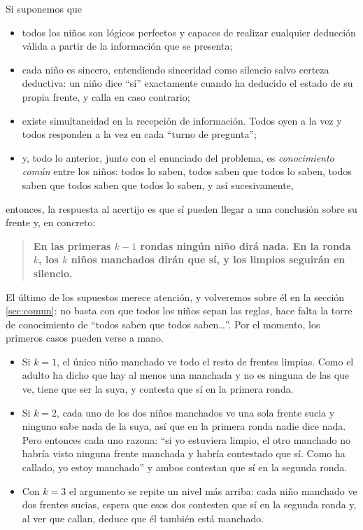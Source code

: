 \vspace{3mm}

Si suponemos que

\begin{itemize}
    \item todos los niños son lógicos perfectos y capaces de realizar cualquier deducción válida a partir de la información que se presenta;
    \item cada niño es sincero, entendiendo sinceridad como silencio salvo certeza deductiva: un niño dice ``sí'' exactamente cuando ha deducido el estado de su propia frente, y calla en caso contrario;
    \item existe simultaneidad en la recepción de información. Todos oyen a la vez y todos responden a la vez en cada ``turno de pregunta'';
    \item y, todo lo anterior, junto con el enunciado del problema, es \emph{conocimiento común} entre los niños: todos lo saben, todos saben que todos lo saben, todos saben que todos saben que todos lo saben, y así sucesivamente,
\end{itemize}

\noindent entonces, la respuesta al acertijo es que sí pueden llegar a una conclusión sobre su frente y, en concreto:

\begin{quote}
  \textbf{En las primeras $k-1$ rondas ningún niño dirá nada. En la ronda $k$, los $k$ niños manchados dirán que sí, y los limpios seguirán en silencio.}
\end{quote}

El último de los supuestos merece atención, y volveremos sobre él en la sección \ref{sec:comun}: no basta con que todos los niños sepan las reglas, hace falta la torre de conocimiento de ``todos saben que todos saben\dots''. Por el momento, los primeros casos pueden verse a mano.

\begin{itemize}
    \item Si $k=1$, el único niño manchado ve todo el resto de frentes limpias. Como el adulto ha dicho que hay al menos una manchada y no es ninguna de las que ve, tiene que ser la suya, y contesta que sí en la primera ronda.
    \item Si $k=2$, cada uno de los dos niños manchados ve una sola frente sucia y ninguno sabe nada de la suya, así que en la primera ronda nadie dice nada. Pero entonces cada uno razona: ``si yo estuviera limpio, el otro manchado no habría visto ninguna frente manchada y habría contestado que sí. Como ha callado, yo estoy manchado'' y ambos contestan que sí en la segunda ronda.
    \item Con $k=3$ el argumento se repite un nivel más arriba: cada niño manchado ve dos frentes sucias, espera que esos dos contesten que sí en la segunda ronda y, al ver que callan, deduce que él también está manchado.
\end{itemize}

